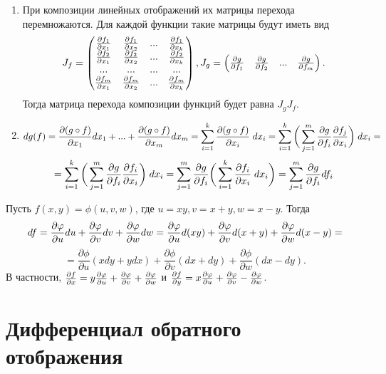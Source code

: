     \begin{explanation}
    	\begin{enumerate}
    		\item При композиции линейных отображений их матрицы перехода перемножаются. Для каждой функции такие матрицы будут иметь вид
    		\[ J_f = \begin{pmatrix}
    			\frac{\partial f_1}{\partial x_1} & \frac{\partial f_1}{\partial x_2} & ... & \frac{\partial f_1}{\partial x_k} \\
    			\frac{\partial f_2}{\partial x_1} & \frac{\partial f_2}{\partial x_2} & ... & \frac{\partial f_2}{\partial x_k} \\
    			... & ... & ... & ... \\
    			\frac{\partial f_m}{\partial x_1} & \frac{\partial f_m}{\partial x_2} & ... & \frac{\partial f_m}{\partial x_k}
    		\end{pmatrix},
    		J_g = \begin{pmatrix}
    			\frac{\partial g}{\partial f_1} & \frac{\partial g}{\partial f_2} & ... & \frac{\partial g}{\partial f_m} \\
    		\end{pmatrix}. \]
    		Тогда матрица перехода композиции функций будет равна $J_g J_f$.
    		\item 
    		\[ dg(f) = \pdv{(g \circ f)}{x_1}dx_1 + ... + \pdv{(g \circ f)}{x_m}dx_m = \sum_{i = 1}^k \frac{\partial (g \circ f)}{\partial x_i} \; dx_i = \sum_{i = 1}^k \bigg(\sum_{j = 1}^m \frac{\partial g}{\partial f_i} \frac{\partial f_j}{\partial x_i} \bigg) \; dx_i = \]
    		\[ = \sum_{i = 1}^k \bigg(\sum_{j = 1}^m \frac{\partial g}{\partial f_i} \frac{\partial f_i}{\partial x_i}\bigg) \; dx_i = \sum_{j = 1}^m \frac{\partial g}{\partial f_i} \bigg(\sum_{i = 1}^k \frac{\partial f_i}{\partial x_i} \; dx_i \bigg) = \sum_{j = 1}^m \frac{\partial g}{\partial f_i} df_i \]
    	\end{enumerate}
    \end{explanation}
    
    \begin{example}
    	Пусть $f(x, y) = \phi(u, v, w)$, где $u = xy, v = x + y, w = x - y$. Тогда
    	\[ df = \pdv{\varphi}{u} du + \pdv{\varphi}{v} dv + \pdv{\varphi}{w} dw = \frac{\partial \varphi}{\partial u} d(xy) + \frac{\partial \varphi}{\partial v} d(x + y) + \frac{\partial \varphi}{\partial w} d(x - y) = \]
    	\[ = \frac{\partial \phi}{\partial u}(xdy + ydx) + \frac{\partial \phi}{\partial v}(dx + dy) + \frac{\partial \phi}{\partial w}(dx - dy). \]
    	В частности, $\pdv{f}{x} = y \pdv{\varphi}{u} + \pdv{\varphi}{v} + \pdv{\varphi}{w}$ и $\pdv{f}{y} = x \pdv{\varphi}{u} + \pdv{\varphi}{v} - \pdv{\varphi}{w}$.
    \end{example}
    
    \section{Дифференциал обратного отображения}
    
